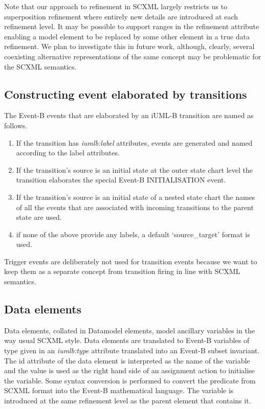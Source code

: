 Note that our approach to refinement in SCXML largely restricts us to superposition refinement where entirely new details are introduced at each refinement level.  It may be possible to support ranges in the refinement attribute enabling a model element to be replaced by some other element in a true data refinement. We plan to investigate this in future work, although, clearly, several coexisting alternative representations of the same concept may be problematic for the SCXML semantics.

\subsection{Constructing event elaborated by transitions}
The Event-B events that are elaborated by an iUML-B  transition are named as follows. 

\begin{enumerate}
\item If the transition has \emph{iumlb:label} attributes, events are generated and named according to the label attributes.
\item If the transition's source is an initial state at the outer state  chart level the transition elaborates the special Event-B INITIALISATION event. 
\item If the transition's source is an initial state of a nested state  chart the names of all the events that are associated with  incoming transitions to the parent state are used.
\item if none of the above provide any labels, a default  `source\_target' format is used.
\end{enumerate}

Trigger events are deliberately not used for  transition events because we want to keep them as a 
separate concept from transition firing in line with SCXML semantics.

\subsection{Data elements}
Data elements, collated in Datamodel elements, model ancillary variables in the way usual SCXML style. Data elements are translated to Event-B variables of type given in an \emph{iumlb:type} attribute translated into an Event-B subset invariant.  The id attribute of the data element is interpreted as the name of the variable and the value is used as the right hand side of an assignment action to initialise the variable.  Some syntax conversion is performed to convert the predicate from SCXML  format into the Event-B mathematical language. The variable is introduced at the same refinement level as the parent element that contains it.



